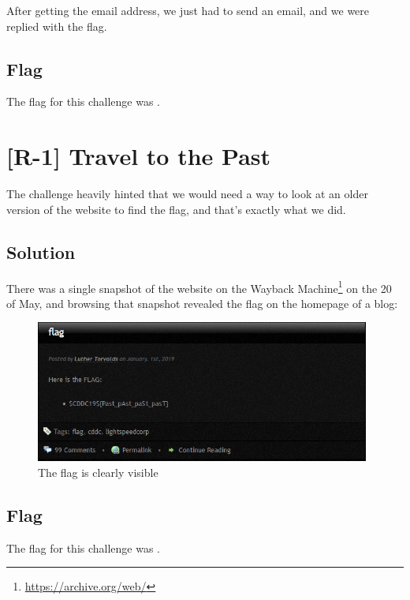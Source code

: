 		After getting the email address, we just had to send an email, and we were replied with the flag.


	\subsection{Flag}
		The flag for this challenge was .



\pagebreak
\section{[R-1] Travel to the Past}

	The challenge heavily hinted that we would need a way to look at an older version of the website to find the flag, and that's exactly
	what we did.

	\subsection{Solution}

		There was a single snapshot of the website on the Wayback Machine\footnote{\url{https://archive.org/web/}} on the 20 of May,
		and browsing that snapshot revealed the flag on the homepage of a blog:

		\begin{figure}[!htbp]\centering
			\includegraphics[width=110mm]{figures/osintred/r1.png} \vspace{5mm}
			\caption{The flag is clearly visible}
		\end{figure}


	\subsection{Flag}
		The flag for this challenge was .

